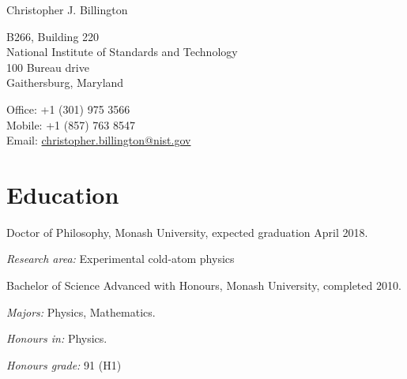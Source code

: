 \documentclass[10pt,letterpaper]{article}
\def\name{Christopher J. Billington}
\renewenvironment{itemize}{
  \begin{list}{}{
    \setlength{\leftmargin}{1.5em}
    \setlength{\itemsep}{0.25em}
    \setlength{\parskip}{0pt}
    \setlength{\parsep}{0.25em}
  }
}{
  \end{list}
}
\begin{document}
{\huge \name}

\bigskip

\begin{minipage}[t]{0.5\textwidth}
  B266, Building 220 \\
  National Institute of Standards and Technology \\
  100 Bureau drive \\
  Gaithersburg, Maryland
\end{minipage}
\begin{minipage}[t]{0.5\textwidth}
  Office: +1 (301) 975 3566 \\
  Mobile: +1 (857) 763 8547 \\
  Email: \href{mailto:christopher.billington@nist.gov}{christopher.billington@nist.gov} \\
\end{minipage}

\section*{Education}

\begin{itemize}

  \item Doctor of Philosophy, Monash University, expected graduation April 2018.
    \begin{itemize}
    \item \textit{Research area:}
      Experimental cold-atom physics
    \end{itemize}
    
  \item Bachelor of Science Advanced with Honours, Monash University, completed 2010.
    \begin{itemize}
    \item \textit{Majors:}
      Physics, Mathematics.
    \item \textit{Honours in:}
      Physics.
    \item \textit{Honours grade:} 91 (H1)
    \end{itemize}
    
  
\end{itemize}
\end{document}
